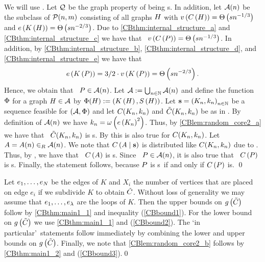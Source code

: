 We will use . Let $\mathcal{Q}$ be the graph property of being \2s. In addition, let $\mathcal{A}(n)$ be the subclass of $\mathcal{P}(n,m)$ consisting of all graphs $H$ with $v\left({C\left(H\right)}\right)=\Theta\left(sn^{-1/3}\right)$ and $e\left({K\left(H\right)}\right)=\Theta\left(sn^{-2/3}\right)$. Due to \ref{CBthm:internal_structure_a} and \ref{CBthm:internal_structure_c} we have that \whp\ $v\left({C\left(P\right)}\right)=\Theta\left(sn^{-1/3}\right)$. In addition, by \ref{CBthm:internal_structure_b}, \ref{CBthm:internal_structure_d}, and \ref{CBthm:internal_structure_e}
we have that \whp\
\begin{align*}
e\left({K\left(P\right)}\right)=3/2 \cdot v\left({K\left(P\right)}\right)=\Theta\left(sn^{-2/3}\right).
\end{align*}
Hence, we obtain that \whp\ $P \in \mathcal{A}(n)$. Let $\mathcal{A}:=\bigcup_{n\in\mathbb{N}} \mathcal{A}(n)$ and define the function $\Phi$ for a graph $H \in \mathcal{A}$ by $\Phi(H):=\left(K\left(H\right), S\left(H\right)\right)$. Let $\mathbf{s}=\left(K_n, k_n\right)_{n\in \mathbb{N}}$ be a sequence feasible for $(\mathcal{A}, \Phi)$ and let $C(K_n, k_n)$ and $\tilde{C}(K_n, k_n)$ be as in . By definition of $\mathcal{A}(n)$ we have $k_n=\omega\left(e\left({K_n}\right)^2\right)$. Thus, by \ref{CBlem:random_core2_a} we have that \whp\ $\tilde{C}(K_n, k_n)$ is \2s. By  this is also true for $C(K_n, k_n)$. Let $A=A(n) \in_R \mathcal{A}(n)$. We note that $C\left(A \mid \mathbf{s}\right)$ is distributed like $C(K_n, k_n)$ due to . Thus, by , we have that \whp\ $C\left(A\right)$ is \2s. Since \whp\ $P \in \mathcal{A}(n)$, it is also true that \whp\ $C\left(P\right)$ is \2s. Finally, the statement follows, because $P$ is \2s\ if and only if $C\left(P\right)$ is.
\qed

Let $e_1, \ldots, e_N$ be the edges of $K$ and $X_i$ the number of vertices that are placed on edge $e_i$ if we subdivide $K$ to obtain $\tilde{C}$. Without loss of generality we may assume that $e_1, \ldots, e_\lambda$ are the loops of $K$. Then the upper bounds on $g\left({\tilde{C}}\right)$ follow by \ref{CBthm:main1_1} and inequality (\ref{CBbound1}). For the lower bound on $g\left({\tilde{C}}\right)$ we use \ref{CBthm:main1_1} and (\ref{CBbound2}). The \lq in particular\rq\ statements follow immediately by combining the lower and upper bounds on $g\left({\tilde{C}}\right)$. Finally, we note that \ref{CBlem:random_core2_b} follows by \ref{CBthm:main1_2} and (\ref{CBbound3}).\qed

